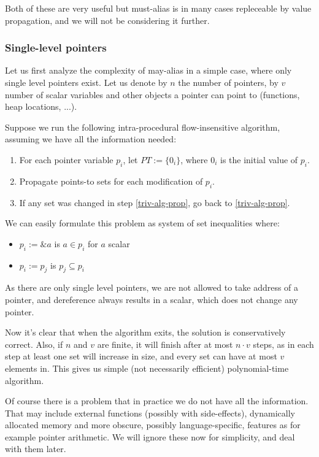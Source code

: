 Both of these are very useful but must-alias is in many cases repleceable by
value propagation, and we will not be considering it further.

\subsubsection{Single-level pointers}

Let us first analyze the complexity of may-alias in a simple case, where only
single level pointers exist. Let us denote by $n$ the number of pointers, by $v$
number of scalar variables and other objects a pointer can point to (functions,
heap locations, ...).

Suppose we run the following intra-procedural flow-insensitive algorithm,
assuming we have all the information needed:

\begin{enumerate}
	\item For each pointer variable $p_i$, let $PT := \{ 0_i \}$, where $0_i$ is
		the initial value of $p_i$.
	\item Propagate points-to sets for each modification of $p_i$.
\label{triv-alg-prop}
	\item If any set was changed in step \ref{triv-alg-prop}, go back to
		\ref{triv-alg-prop}.
\end{enumerate}

We can easily formulate this problem as system of set inequalities where:

\begin{itemize}
	\item $p_i := \&a$ is $a \in p_i$ for $a$ scalar
	\item $p_i := p_j$ is $p_j \subseteq p_i$
\end{itemize}

As there are only single level pointers, we are not allowed to take address of a
pointer, and dereference always results in a scalar, which does not change any
pointer.

Now it's clear that when the algorithm exits, the solution is conservatively
correct. Also, if $n$ and $v$ are finite, it will finish after at most $n \cdot
v$ steps, as in each step at least one set will increase in size, and every set
can have at most $v$ elements in.
This gives us simple (not necessarily efficient) polynomial-time algorithm.

Of course there is a problem that in practice we  do not have all the information.
That may include external functions (possibly with side-effects), dynamically
allocated memory and more obscure, possibly language-specific, features as for
example pointer arithmetic. We will ignore these now for simplicity, and
deal with them later. 

